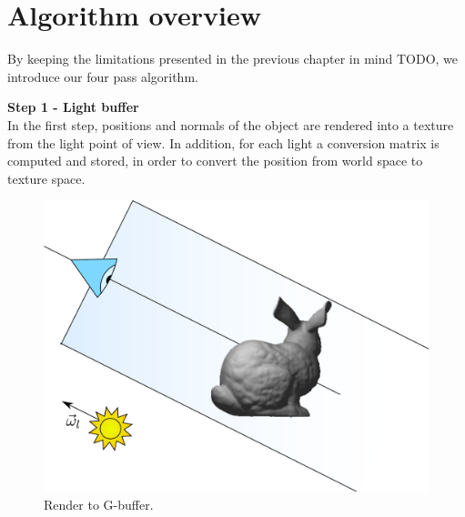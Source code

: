 %
%
%
%

\section{Algorithm overview}

By keeping the limitations presented in the previous chapter in mind TODO, we introduce our four pass algorithm. 

\textbf{Step 1 - Light buffer} \\
In the first step, positions and normals of the object are rendered into a texture from the light point of view. In addition, for each light a conversion matrix is computed and stored, in order to convert the position from world space to texture space. 

\begin{figure}[!ht]
\centering
\includegraphics[width=0.5 \linewidth]{images/method/step1}
\caption{Render to G-buffer.}
\label{fig:step1}
\end{figure} 



